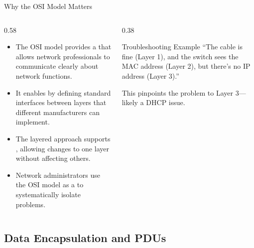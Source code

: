 \documentclass[aspectratio=169]{beamer}  %
\begin{document}
\begin{frame}{Why the OSI Model Matters}
    \begin{columns}[T]
        \begin{column}{0.58\textwidth}
            \begin{itemize}
                \item The OSI model provides a  that allows network professionals to communicate clearly about network functions.
                \item It enables  by defining standard interfaces between layers that different manufacturers can implement.
                \item The layered approach supports , allowing changes to one layer without affecting others.
                \item Network administrators use the OSI model as a  to systematically isolate problems.
            \end{itemize}
        \end{column}
        \begin{column}{0.38\textwidth}
            \begin{exampleblock}{Troubleshooting Example}
                \small
                ``The cable is fine (Layer 1), and the switch sees the MAC address (Layer 2), but there's no IP address (Layer 3).''
                
                \vspace{0.3em}
                This pinpoints the problem to Layer 3---likely a DHCP issue.
            \end{exampleblock}
        \end{column}
    \end{columns}
\end{frame}

\subsection{Data Encapsulation and PDUs}

\end{document}
